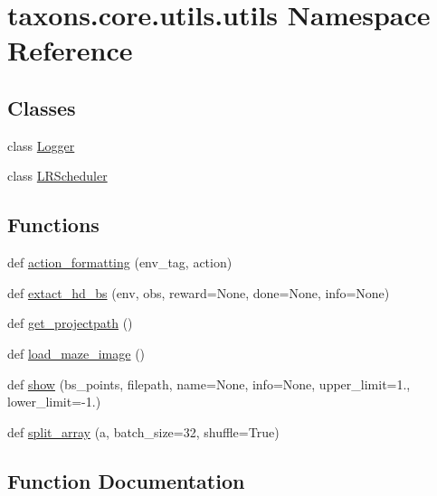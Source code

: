 \hypertarget{namespacetaxons_1_1core_1_1utils_1_1utils}{}\section{taxons.\+core.\+utils.\+utils Namespace Reference}
\label{namespacetaxons_1_1core_1_1utils_1_1utils}
\subsection*{Classes}
\begin{DoxyCompactItemize}
\item 
class \hyperlink{classtaxons_1_1core_1_1utils_1_1utils_1_1_logger}{Logger}
\item 
class \hyperlink{classtaxons_1_1core_1_1utils_1_1utils_1_1_l_r_scheduler}{L\+R\+Scheduler}
\end{DoxyCompactItemize}
\subsection*{Functions}
\begin{DoxyCompactItemize}
\item 
def \hyperlink{namespacetaxons_1_1core_1_1utils_1_1utils_af0b38389a6302a0fe06869a5a5ffe086}{action\+\_\+formatting} (env\+\_\+tag, action)
\item 
def \hyperlink{namespacetaxons_1_1core_1_1utils_1_1utils_a629ccb54bab5ae9cee4f016017b7b9d3}{extact\+\_\+hd\+\_\+bs} (env, obs, reward=None, done=None, info=None)
\item 
def \hyperlink{namespacetaxons_1_1core_1_1utils_1_1utils_a1a70d5f1e4d5e2cb6ec8951bbdff0294}{get\+\_\+projectpath} ()
\item 
def \hyperlink{namespacetaxons_1_1core_1_1utils_1_1utils_a2cb425a7fa80aa77e4c25fcd62838983}{load\+\_\+maze\+\_\+image} ()
\item 
def \hyperlink{namespacetaxons_1_1core_1_1utils_1_1utils_a0e8cd889f76b244430f15bd6bd20f183}{show} (bs\+\_\+points, filepath, name=None, info=None, upper\+\_\+limit=1., lower\+\_\+limit=-\/1.)
\item 
def \hyperlink{namespacetaxons_1_1core_1_1utils_1_1utils_a41d33b1359a91d1b135117de312074b5}{split\+\_\+array} (a, batch\+\_\+size=32, shuffle=True)
\end{DoxyCompactItemize}


\subsection{Function Documentation}
